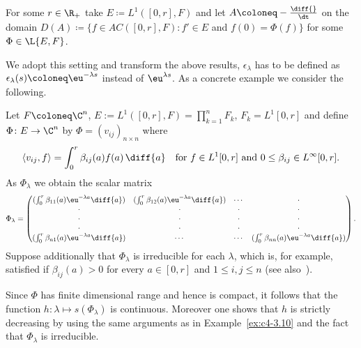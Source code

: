 For some $r \in \R_{+}$ take $E \coloneq L^{1}([0,r], F)$ and let $A \coloneq - \frac{\diff{}}{\dt}$ on the domain $D(A) \coloneq \{f \in AC([0,r], F) \colon f' \in E$ and $f(0) = \Phi(f)\}$ for some $\Phi \in \L{E,F}$.

We adopt this setting and transform the above results, \eg $\epsilon_{\lambda}$ has to be defined as $\epsilon_{\lambda}(s) \coloneq \eu^{-\lambda s}$ instead of\/ $\eu^{\lambda s}$.
As a concrete example we consider the following.


\begin{example}\label{ex:c4-3.12}
%
%
Let $F \coloneq \C^{n}$, $E:= L^{1}([0,r],F) = \prod_{k=1}^{n} F_{k}$, $F_{k} = L^{1}[0,r]$ and define $\Phi \colon E \to \C^{n}$ by $\Phi = (v_{ij})_{{n\times n}}$ where
\[
\langle v_{ij}, f \rangle = \int_{0}^{r} \beta_{ij}(a)f(a) \, \diff{a} \quad \text{for } f \in L^{1}[0,r] \text{ and } 0 \leq \beta_{ij} \in L^{\infty}[0,r]  .
\]
As $\Phi_{\lambda}$ we obtain the scalar matrix
\begin{equation*}\label{eq:c4-3.12-kgk2}
\Phi_{\lambda} = \begin{pmatrix}
(\int_0^r \beta_{11}(a)\eu^{-\lambda a}\diff{a}) & (\int_0^r \beta_{12}(a)\eu^{-\lambda a}\diff{a}) & \cdots & \cdot \\
\cdot & \cdot & \cdot & \cdot \\
\cdot & \cdot & \cdot & \cdot \\
\cdot & \cdot & \cdot & \cdot \\
(\int_0^r \beta_{n1}(a)\eu^{-\lambda a}\diff{a}) & \cdots & \cdots & (\int_0^r \beta_{nn}(a)\eu^{-\lambda a}\diff{a})
\end{pmatrix} . 
\end{equation*}
Suppose additionally that $\Phi_{\lambda}$ is irreducible for each $\lambda$, which is, for example, satisfied if\/ $\beta_{ij}(a) > 0$ for every $a \in [0,r]$ and $1 \leq i,j \leq n$ (see also \textcite[p.257ff]{bellmancooke:1963}\,).

Since $\Phi$ has finite dimensional range and hence is compact, it follows that the function $h \colon \lambda \mapsto s(\Phi_{\lambda})$ is continuous.
Moreover one shows that $h$ is strictly decreasing by using the same arguments as in Example~\ref{ex:c4-3.10} and the fact that $\Phi_{\lambda}$ is irreducible.


\end{example}
